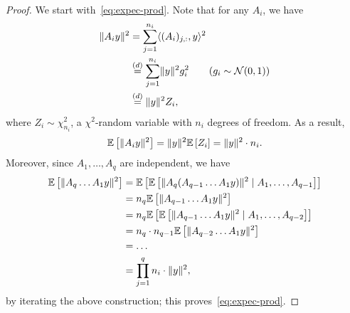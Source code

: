 \begin{proof}
    We start with~\eqref{eq:expec-prod}. Note that for any $A_{i}$, we have
	\begin{align*}
		\lVert A_{i} y\rVert^2 & = \sum_{j = 1}^{n_i} \langle(A_{i})_{j, :}, y\rangle^2                                      \\
		                 & \overset{(d)}{=} \sum_{j = 1}^{n_i} \lVert y\rVert^2 g_{i}^2 \qquad (g_i \sim \mathcal{N}(0, 1)) \\
		                 & \overset{(d)}{=} \lVert y\rVert^2 Z_{i},
	\end{align*}
	where $Z_i \sim \chi^2_{n_i}$, a $\chi^2$-random variable with $n_i$ degrees of freedom. As a result,
	\[
		\mathbb{E}\left[ {\lVert A_i y\rVert^2} \right] = \lVert y\rVert^2 \mathbb{E}\left[ {Z_{i}} \right] = \lVert y\rVert^2 \cdot n_{i}.
	\]
	Moreover, since $A_{1}, \dots, A_{q}$ are independent, we have
	\begin{align*}
		\mathbb{E}\left[ {\lVert A_{q} \dots A_1 y\rVert^2} \right] & =
		\mathbb{E}\left[ {\mathbb{E}\left[ {\lVert A_{q} (A_{q-1} \dots A_1 y)\rVert^2 \mid A_{1}, \dots, A_{q-1}} \right]} \right] \\
		                                   & =
		n_{q} \mathbb{E}\left[ {\lVert A_{q-1} \dots A_{1} y\rVert^2} \right]                                    \\
		                                   & =
		n_{q} \mathbb{E}\left[ {\mathbb{E}\left[ {\lVert A_{q-1} \dots A_1 y\rVert^2 \mid A_{1}, \dots, A_{q-2}} \right]} \right]   \\
		                                   & =
		n_{q} \cdot n_{q-1} \mathbb{E}\left[ {\lVert A_{q-2} \dots A_1 y\rVert^2} \right]                        \\
		                                   & = \dots                                    \\
		                                   & = \prod_{j = 1}^q n_{i} \cdot \lVert y\rVert^2,
	\end{align*}
	by iterating the above construction; this proves~\cref{eq:expec-prod}.

	\vspace{11pt}


\end{proof}

